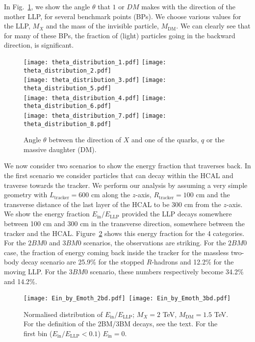 \documentclass[10pt]{article}
\begin{document}
In Fig.~\ref{fig:LLP_BMO_1}, we show the angle $\theta$ that $1$ or $DM$ makes with the direction of the mother LLP, for several benchmark points (BPs). We choose various values for the LLP, $M_X$ and the mass of the invisible particle, $M_\text{DM}$. We can clearly see that for many of these BPs, the fraction of (light) particles going in the backward direction, is significant.

\begin{figure}[tbhp]
	\texttt{[image: theta\_distribution\_1.pdf]}
	\texttt{[image: theta\_distribution\_2.pdf]}\\
	\texttt{[image: theta\_distribution\_3.pdf]}
	\texttt{[image: theta\_distribution\_5.pdf]}\\
	\texttt{[image: theta\_distribution\_4.pdf]}
	\texttt{[image: theta\_distribution\_6.pdf]}\\
	\texttt{[image: theta\_distribution\_7.pdf]}
	\texttt{[image: theta\_distribution\_8.pdf]}\\
	\caption{Angle $\theta$ between the direction of $X$ and one of the quarks, $q$ or the massive daughter (DM).}
	\label{fig:LLP_BMO_1}
\end{figure}

We now consider two scenarios to show the energy fraction that traverses back. In the first scenario we consider particles that can decay within the HCAL and traverse towards the tracker. We perform our analysis by assuming a very simple geometry with $L_\text{tracker} = 600$ cm along the $z$-axis, $R_\text{tracker} = 100$ cm and the transverse distance of the last layer of the HCAL to be 300 cm from the $z$-axis. We show the energy fraction $E_\text{in}/E_\text{LLP}$ provided the LLP decays somewhere between 100 cm and 300 cm in the transverse direction, somewhere between the tracker and the HCAL. Figure~\ref{fig:LLP_BMO_2} shows this energy fraction for the 4 categories. For the $2BM0$ and $3BM0$ scenarios, the observations are striking. For the $2BM0$ case, the fraction of energy coming back inside the tracker for the massless two-body decay scenario are 25.9\% for the stopped $R$-hadrons and 12.2\% for the moving LLP. For the $3BM0$ scenario, these numbers respectively become 34.2\% and 14.2\%.

\begin{figure}[!h]
	\centering
	\texttt{[image: Ein\_by\_Emoth\_2bd.pdf]}~\texttt{[image: Ein\_by\_Emoth\_3bd.pdf]}
	\caption{Normalised distribution of $E_{\textrm{in}}/E_{\textrm{LLP}}$; $M_{X}=2$ TeV, $M_{\textrm{DM}}=1.5$ TeV. For the definition of the 2BM/3BM decays, see the text. For the first bin ($E_{\textrm{in}}/E_{\textrm{LLP}}< 0.1$) $E_{\textrm{in}}=0$.}
	\label{fig:LLP_BMO_2}
\end{figure}
\end{document}
